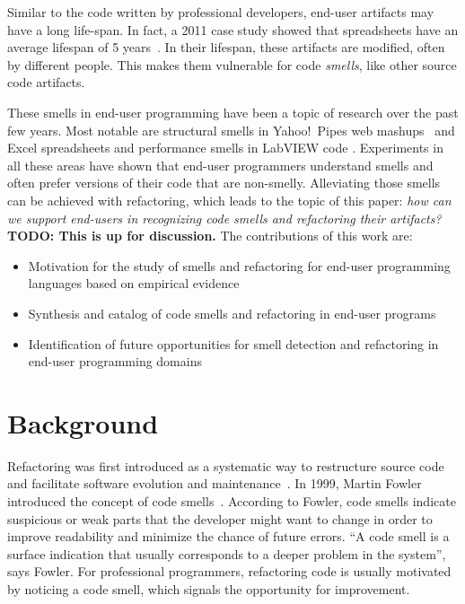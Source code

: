 \documentclass[10pt,conference,compsocconf]{IEEEtran}
\newcommand{\todo}[1]{\textbf{TODO: #1}}
\begin{document}
Similar to the code written by professional developers, end-user artifacts may have a long life-span. In fact, a 2011 case study showed that spreadsheets have an average lifespan of 5 years~\cite{Hermans2011}. In their lifespan, these artifacts are modified, often by different people. This makes them vulnerable for code \emph{smells}, like other source code artifacts. 

These smells in end-user programming have been a topic of research over the past few years. Most notable are structural smells in Yahoo!\ Pipes web mashups~\cite{Stolee2011} and  Excel spreadsheets \cite{Hermans2012inter} and performance smells in LabVIEW code \cite{chambers2013smell}. Experiments in all these areas have shown that end-user programmers understand smells and often prefer versions of their code that are non-smelly. Alleviating those smells can be achieved with refactoring, which leads to the topic of this paper: \emph{how can we support end-users in recognizing code smells and refactoring their artifacts?} \todo{This is up for discussion.} The contributions of this work are:

\begin{itemize}
	\item Motivation for the study of smells and refactoring for end-user programming languages based on empirical evidence
	\item Synthesis and catalog of code smells  and refactoring in end-user programs
	\item Identification of future opportunities for smell detection and refactoring in end-user programming domains
\end{itemize}

\section{Background}
\label{sec:background}


Refactoring was first introduced as a systematic way to restructure source code and facilitate software evolution and maintenance~\cite{Opdyke:1992:ROF:169783, Griswold:1993:AAP:152388.152389}. In 1999, Martin Fowler introduced the concept of code smells~\cite{Fowl1999}. 
According to Fowler, code smells indicate suspicious or weak parts that the developer might want to change in order to improve readability and minimize the chance of future errors. ``A code smell is a surface indication that usually corresponds to a deeper problem in the system'', says Fowler. For professional programmers, refactoring code is usually motivated by noticing a code smell, which signals the opportunity for improvement.
\end{document}

